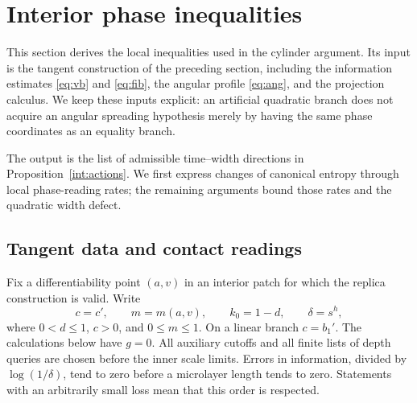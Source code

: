 \section{Interior phase inequalities}\label{int:section}

This section derives the local inequalities used in the cylinder argument.
Its input is the tangent construction of the preceding section, including
the information estimates \eqref{eq:vb} and \eqref{eq:fib}, the angular
profile \eqref{eq:ang}, and the projection calculus. We keep these inputs
explicit: an artificial quadratic branch does not acquire an angular
spreading hypothesis merely by having the same phase coordinates as an
equality branch.

The output is the list of admissible time--width directions in
Proposition~\ref{int:actions}. We first express changes of canonical entropy
through local phase-reading rates; the remaining arguments bound those
rates and the quadratic width defect.

\subsection{Tangent data and contact readings}

Fix a differentiability point $(a,v)$ in an interior patch for which the
replica construction is valid. Write
\[
 c=c',\qquad m=m(a,v),\qquad k_0=1-d,\qquad
 \delta=s^h,
\]
where $0<d\leq1$, $c>0$, and $0\leq m\leq1$. On a linear branch $c=b_1'$.
The calculations below have $g=0$. All auxiliary cutoffs and all finite
lists of depth queries are chosen before the inner scale limits. Errors
in information, divided by $\log(1/\delta)$, tend to zero before a
microlayer length tends to zero. Statements with an arbitrarily small
loss mean that this order is respected.

